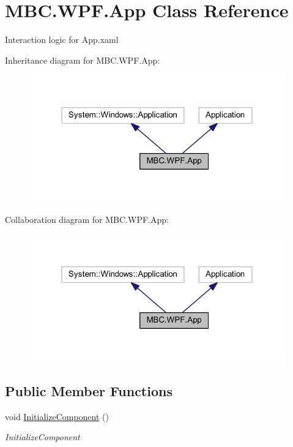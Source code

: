 \hypertarget{class_m_b_c_1_1_w_p_f_1_1_app}{\section{M\-B\-C.\-W\-P\-F.\-App Class Reference}
\label{class_m_b_c_1_1_w_p_f_1_1_app}
}


Interaction logic for App.\-xaml  




Inheritance diagram for M\-B\-C.\-W\-P\-F.\-App\-:\nopagebreak
\begin{figure}[H]
\begin{center}
\leavevmode
\includegraphics[width=313pt]{class_m_b_c_1_1_w_p_f_1_1_app__inherit__graph}
\end{center}
\end{figure}


Collaboration diagram for M\-B\-C.\-W\-P\-F.\-App\-:\nopagebreak
\begin{figure}[H]
\begin{center}
\leavevmode
\includegraphics[width=313pt]{class_m_b_c_1_1_w_p_f_1_1_app__coll__graph}
\end{center}
\end{figure}
\subsection*{Public Member Functions}
\begin{DoxyCompactItemize}
\item 
void \hyperlink{class_m_b_c_1_1_w_p_f_1_1_app_a64e84c389e5f4a2e06725318efe701da}{Initialize\-Component} ()
\begin{DoxyCompactList}\small\item\em Initialize\-Component \end{DoxyCompactList}\end{DoxyCompactItemize}
